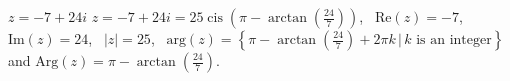 { $z = -7 + 24i$}
{ $z = -7 + 24i = 25\operatorname{cis}\left(\pi - \arctan\left(\frac{24}{7}\right)\right)$, \, $\text{Re}(z) = -7$, \, $\text{Im}(z) = 24$, \, $|z| = 25$, \, $\text{arg}(z) = \left\{\pi - \arctan\left(\frac{24}{7}\right) + 2\pi k \, | \, \text{$k$ is an integer} \right\}$ and $\text{Arg}(z) =\pi - \arctan\left(\frac{24}{7}\right) $.}
